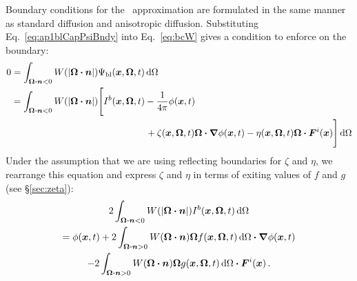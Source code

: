 Boundary conditions for the \APone\ approximation are formulated in the same
manner as standard diffusion and anisotropic diffusion.
Substituting Eq.~\eqref{eq:ap1blCapPsiBndy} into Eq.~\eqref{eq:bcW} gives a
condition to enforce on the boundary:
\begin{align*}
  0 &= \int_{\bm{\Omega} \bm{\cdot} \bm{n} < 0} W(\left| \bm{\Omega} \bm{\cdot} \bm{n} \right|)
  \Psi_\mathrm{bl} (\bm{x}, \bm{\Omega}, t) \mathop{}\!\mathrm{d}\Omega
  \\
  &= \int_{\bm{\Omega} \bm{\cdot} \bm{n} < 0} W(\left| \bm{\Omega} \bm{\cdot} \bm{n} \right|)
 \Bigg[ I^b(\bm{x}, \bm{\Omega}, t) - \frac{1}{4\pi} \phi(\bm{x}, t)
  \\
  &\hspace{2in}
  + \zeta(\bm{x}, \bm{\Omega}, t) \bm{\Omega}\bm{\cdot} \bm{\nabla} \phi(\bm{x}, t)
  - \eta(\bm{x}, \bm{\Omega}, t) \bm{\Omega}\bm{\cdot} \bm{F}^i(\bm{x}) \Bigg]
  \mathop{}\!\mathrm{d}\Omega
\end{align*}
Under the assumption that we are using reflecting boundaries for $\zeta$
and $\eta$, we rearrange this equation and express $\zeta$ and $\eta$ in terms of
exiting values of $f$ and $g$ (see \S\ref{sec:zeta}):
\begin{multline}\label{eq:ap1loBndy}
  2 \int_{\bm{\Omega} \bm{\cdot} \bm{n} < 0} W(\left| \bm{\Omega} \bm{\cdot} \bm{n} \right|)
  I^b(\bm{x}, \bm{\Omega}, t) \mathop{}\!\mathrm{d}\Omega
  \\
  =
 \phi(\bm{x}, t)
  + 2\int_{\bm{\Omega}\bm{\cdot} \bm{n} > 0} W(\bm{\Omega} \bm{\cdot} \bm{n})
  \bm{\Omega} f(\bm{x}, \bm{\Omega},t) \mathop{}\!\mathrm{d}\Omega
  \bm{\cdot} \bm{\nabla} \phi(\bm{x}, t) 
  \\
  - 2\int_{\bm{\Omega}\bm{\cdot} \bm{n} > 0} W(\bm{\Omega} \bm{\cdot} \bm{n})
  \bm{\Omega} g(\bm{x}, \bm{\Omega},t) \mathop{}\!\mathrm{d}\Omega
  \bm{\cdot} \bm{F}^i(\bm{x}) 
  \,.
\end{multline}

